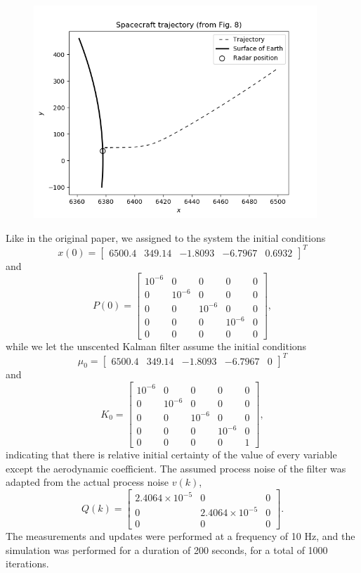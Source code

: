 \documentclass[]{article}
\begin{document}
\begin{figure}[ht!]
\centering\noindent
\includegraphics[width=0.95\textwidth]{Fig_8_Trajectory.png}
\label{fig:fig8}
\end{figure}

Like in the original paper, we assigned to the system the initial conditions
\[x(0) = \begin{bmatrix} 6500.4 & 349.14 & -1.8093 & -6.7967 & 0.6932 \end{bmatrix}^{T}\]
and
\[P(0) = \begin{bmatrix}
10^{-6} & 0 & 0 & 0 & 0 \\
0 & 10^{-6} & 0 & 0 & 0 \\
0 & 0 & 10^{-6} & 0 & 0 \\
0 & 0 & 0 & 10^{-6} & 0 \\
0 & 0 & 0 & 0 & 0
\end{bmatrix},\]
while we let the unscented Kalman filter assume the initial conditions
\[\mu_{0} = \begin{bmatrix} 6500.4 & 349.14 & -1.8093 & -6.7967 & 0 \end{bmatrix}^{T}\]
and
\[K_{0} = \begin{bmatrix}
10^{-6} & 0 & 0 & 0 & 0 \\
0 & 10^{-6} & 0 & 0 & 0 \\
0 & 0 & 10^{-6} & 0 & 0 \\
0 & 0 & 0 & 10^{-6} & 0 \\
0 & 0 & 0 & 0 & 1
\end{bmatrix},\]
indicating that there is relative initial certainty of the value of every variable except the aerodynamic coefficient. The assumed process noise of the filter was adapted from the actual process noise $v(k)$,
\[Q(k) = \begin{bmatrix}
2.4064 \times 10^{-5} & 0 & 0 \\
0 & 2.4064 \times 10^{-5} & 0 \\
0 & 0 & 0 \end{bmatrix}.\]
The measurements and updates were performed at a frequency of 10 Hz, and the simulation was performed for a duration of 200 seconds, for a total of 1000 iterations.
\end{document}
